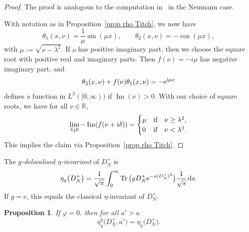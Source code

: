\documentclass[10pt,a4paper]{amsart}
\numberwithin{equation}{section}
\newtheorem{Proposition}[Theorem]{Proposition}
 { \theoremstyle{definition}
\newtheorem{Definition}[Theorem]{Definition}
\newtheorem{Note}[Theorem]{Note}
\newtheorem{Example}[Theorem]{Example}
\newtheorem{Remark}[Theorem]{Remark} }
\DeclareMathOperator{\Tr}{Tr}
\DeclareMathOperator{\Imag}{Im}
\newcommand{\R}{\mathbb{R}}
\begin{document}
\begin{proof}The proof is analogous to the computation in~\cite[Section~4.1]{Titchmarsh62} in the Neumann case.

With notation as in Proposition~\ref{prop rho Titch}, we now have
\[
\theta_1(x, \nu)= \frac{1}{\mu}\sin(\mu x),\qquad
\theta_2(x, \nu)= - \cos(\mu x),
\]
with $\mu := \sqrt{\nu - \lambda^2}$. If $\nu$ has positive imaginary part, then we choose the square root with positive real and imaginary parts. Then
 $f(\nu) = -i\mu$ has negative imaginary part, and
 \[
 \theta_2(x, \nu) + f(\nu) \theta_1(x, \nu) = -{\rm e}^{{\rm i}\mu x}
 \]
 defines a function in $L^2([0,\infty))$ if $\Imag(\nu)>0$.
 With our choice of square roots, we have for all $\nu \in \R$,
 \[
 \lim_{\delta \downarrow 0} -\Imag(f(\nu+{\rm i}\delta)) =
 \begin{cases}
 \mu & \text{if\quad $\nu \geq \lambda^2$},\\
 0 & \text{if\quad$\nu < \lambda^2$}.
 \end{cases}
 \]
 This implies the claim via
 Proposition~\ref{prop rho Titch}.
\end{proof}

The \emph{$g$-delocalised $\eta$-invariant} of $D_N^+$ \cite{Donnelly, HWW, Lott99} is
\[
\eta_g\big(D_N^+\big) = \frac{1}{\sqrt{\pi}}\int_0^{\infty} \Tr\big(g D_N^+ {\rm e}^{-s(D_N^+)^2}\big) \frac{1}{\sqrt{s}}\, {\rm d}s.
\]
If $g = e$, this equals the classical $\eta$-invariant of $D_N^+$.
\begin{Proposition}\label{prop cusp contr cylinder}
If $\varphi = 0$, then for all $a'>a$
\[
\eta^{0}_g\big(D_N^+, a'\big)=\eta_g\big(D_N^+\big).
\]
\end{Proposition}
\end{document}

